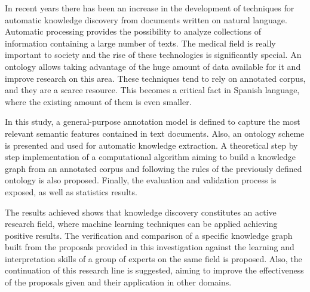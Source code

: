 \label{chapter:abstract_english}


In recent years there has been an increase in the development of techniques for automatic knowledge discovery from documents written on natural language. Automatic processing provides the possibility to analyze collections of information containing a large number of texts. The medical field is really important to society and the rise of these technologies is significantly special. An ontology allows taking advantage of the huge amount of data available for it and improve research on this area. These techniques tend to rely on annotated corpus, and they are a scarce resource. This becomes a critical fact in Spanish language, where the existing amount of them is even smaller.

In this study, a general-purpose annotation model is defined to capture the most relevant semantic features contained in text documents. Also, an ontology scheme is presented and used for automatic knowledge extraction. A theoretical step by step implementation of a computational algorithm aiming to build a knowledge graph from an annotated corpus and following the rules of the previously defined ontology is also proposed. Finally, the evaluation and validation process is exposed, as well as statistics results.

The results achieved shows that knowledge discovery constitutes an active research field, where machine learning techniques can be applied achieving positive results. The verification and comparison of a specific knowledge graph built from the proposals provided in this investigation against the learning and interpretation skills of a group of experts on the same field is proposed. Also, the continuation of this research line is suggested, aiming to improve the effectiveness of the proposals given and their application in other domains.
